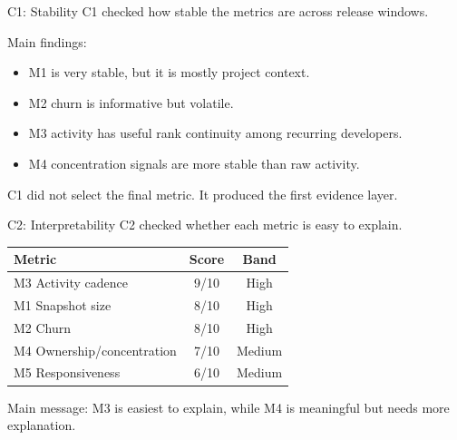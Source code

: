\documentclass[aspectratio=169,11pt]{beamer}
\begin{document}
\begin{frame}{C1: Stability}
  C1 checked how stable the metrics are across release windows.

  \vspace{0.2cm}
  Main findings:
  \begin{itemize}
    \item M1 is very stable, but it is mostly project context.
    \item M2 churn is informative but volatile.
    \item M3 activity has useful rank continuity among recurring developers.
    \item M4 concentration signals are more stable than raw activity.
  \end{itemize}

  \vspace{0.3cm}
  C1 did not select the final metric. It produced the first evidence layer.
\end{frame}

\begin{frame}{C2: Interpretability}
  C2 checked whether each metric is easy to explain.

  \begin{table}
    \footnotesize
    \begin{tabular}{lcc}
      \toprule
      Metric & Score & Band \\
      \midrule
      M3 Activity cadence & 9/10 & High \\
      M1 Snapshot size & 8/10 & High \\
      M2 Churn & 8/10 & High \\
      M4 Ownership/concentration & 7/10 & Medium \\
      M5 Responsiveness & 6/10 & Medium \\
      \bottomrule
    \end{tabular}
  \end{table}

  \vspace{0.2cm}
  Main message: M3 is easiest to explain, while M4 is meaningful but needs more explanation.
\end{frame}
\end{document}
